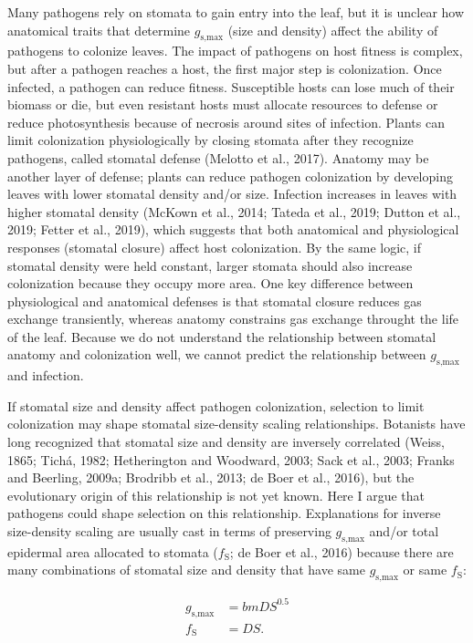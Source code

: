 \documentclass[utf8]{frontiersSCNS}
\newcommand{\fs}{$f_\text{S}$}
\newcommand{\gsmax}{$g_\text{s,max}$}
\begin{document}
Many pathogens rely on stomata to gain entry into the leaf, but it is
unclear how anatomical traits that determine \gsmax{} (size and density)
affect the ability of pathogens to colonize leaves. The impact of
pathogens on host fitness is complex, but after a pathogen reaches a
host, the first major step is colonization. Once infected, a pathogen
can reduce fitness. Susceptible hosts can lose much of their biomass or
die, but even resistant hosts must allocate resources to defense or
reduce photosynthesis because of necrosis around sites of infection.
Plants can limit colonization physiologically by closing stomata after
they recognize pathogens, called stomatal defense (Melotto et al.,
2017). Anatomy may be another layer of defense; plants can reduce
pathogen colonization by developing leaves with lower stomatal density
and/or size. Infection increases in leaves with higher stomatal density
(McKown et al., 2014; Tateda et al., 2019; Dutton et al., 2019; Fetter
et al., 2019), which suggests that both anatomical and physiological
responses (stomatal closure) affect host colonization. By the same
logic, if stomatal density were held constant, larger stomata should
also increase colonization because they occupy more area. One key
difference between physiological and anatomical defenses is that
stomatal closure reduces gas exchange transiently, whereas anatomy
constrains gas exchange throught the life of the leaf. Because we do not
understand the relationship between stomatal anatomy and colonization
well, we cannot predict the relationship between \gsmax{} and infection.

If stomatal size and density affect pathogen colonization, selection to
limit colonization may shape stomatal size-density scaling
relationships. Botanists have long recognized that stomatal size and
density are inversely correlated (Weiss, 1865; Tichá, 1982; Hetherington
and Woodward, 2003; Sack et al., 2003; Franks and Beerling, 2009a;
Brodribb et al., 2013; de Boer et al., 2016), but the evolutionary
origin of this relationship is not yet known. Here I argue that
pathogens could shape selection on this relationship. Explanations for
inverse size-density scaling are usually cast in terms of preserving
\gsmax{} and/or total epidermal area allocated to stomata (\fs; de Boer
et al., 2016) because there are many combinations of stomatal size and
density that have same \gsmax{} or same \fs{}:

\begin{align}
  g_\text{s,max} & = b m D S ^ {0.5} \label{eq:gsmax} \\
  f_\text{S} & = D S \label{eq:fs}.
\end{align}
\end{document}
